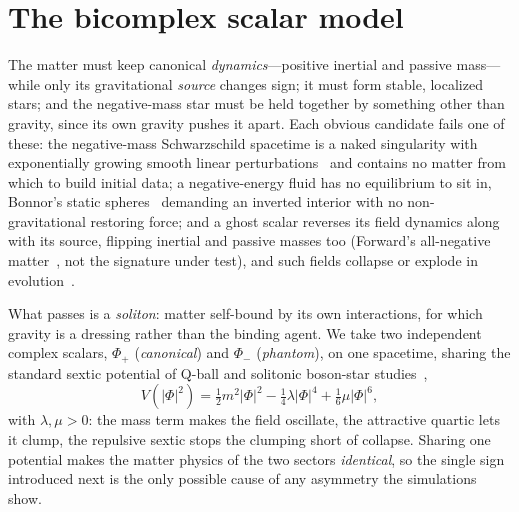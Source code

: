 \documentclass[twocolumn,floatfix,aps,prd,nofootinbib]{revtex4-2}
\begin{document}
\section{The bicomplex scalar model}
\label{sec:model}

The matter must keep canonical \emph{dynamics}---positive inertial and passive mass---while only its gravitational \emph{source} changes sign; it must form stable, localized stars; and the negative-mass star must be held together by something other than gravity, since its own gravity pushes it apart. Each obvious candidate fails one of these: the negative-mass Schwarzschild spacetime is a naked singularity with exponentially growing smooth linear perturbations~\cite{gleiser2006} and contains no matter from which to build initial data; a negative-energy fluid has no equilibrium to sit in, Bonnor's static spheres~\cite{bonnor1989} demanding an inverted interior with no non-gravitational restoring force; and a ghost scalar reverses its field dynamics along with its source, flipping inertial and passive masses too (Forward's all-negative matter~\cite{forward1990}, not the signature under test), and such fields collapse or explode in evolution~\cite{shinkai2002,gonzalez2009,shirokov2026}.

What passes is a \emph{soliton}: matter self-bound by its own interactions, for which gravity is a dressing rather than the binding agent. We take two independent complex scalars, $\Phi_+$ (\emph{canonical}) and $\Phi_-$ (\emph{phantom}), on one spacetime, sharing the standard sextic potential of Q-ball and solitonic boson-star studies~\cite{friedberg1976,coleman1985,friedberg1987},
\begin{equation}
V(|\Phi|^2)=\tfrac12 m^2|\Phi|^2-\tfrac14\lambda|\Phi|^4+\tfrac16\mu|\Phi|^6 ,
\label{eq:potential}
\end{equation}
with $\lambda,\mu>0$: the mass term makes the field oscillate, the attractive quartic lets it clump, the repulsive sextic stops the clumping short of collapse. Sharing one potential makes the matter physics of the two sectors \emph{identical}, so the single sign introduced next is the only possible cause of any asymmetry the simulations show.
\end{document}
